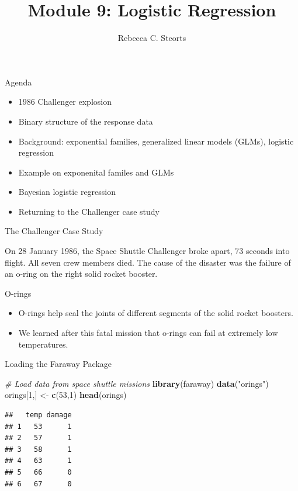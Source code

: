 \documentclass[
  ignorenonframetext,
]{beamer}
\title{Module 9: Logistic Regression}
\author{Rebecca C. Steorts}
\date{}
\newenvironment{Shaded}{\begin{snugshade}}{\end{snugshade}}
\newcommand{\CommentTok}[1]{\textcolor[rgb]{0.56,0.35,0.01}{\textit{#1}}}
\newcommand{\DecValTok}[1]{\textcolor[rgb]{0.00,0.00,0.81}{#1}}
\newcommand{\KeywordTok}[1]{\textcolor[rgb]{0.13,0.29,0.53}{\textbf{#1}}}
\newcommand{\NormalTok}[1]{#1}
\newcommand{\StringTok}[1]{\textcolor[rgb]{0.31,0.60,0.02}{#1}}
\providecommand{\tightlist}{%
  \setlength{\itemsep}{0pt}\setlength{\parskip}{0pt}}
\begin{document}
\frame{\titlepage}

\begin{frame}{Agenda}
\protect\hypertarget{agenda}{}

\begin{itemize}
\tightlist
\item
  1986 Challenger explosion
\item
  Binary structure of the response data
\item
  Background: exponential families, generalized linear models (GLMs),
  logistic regression
\item
  Example on exponenital familes and GLMs
\item
  Bayesian logistic regression
\item
  Returning to the Challenger case study
\end{itemize}

\end{frame}

\begin{frame}{The Challenger Case Study}
\protect\hypertarget{the-challenger-case-study}{}

On 28 January 1986, the Space Shuttle Challenger broke apart, 73 seconds
into flight. All seven crew members died. The cause of the disaster was
the failure of an o-ring on the right solid rocket booster.

\end{frame}

\begin{frame}{O-rings}
\protect\hypertarget{o-rings}{}

\begin{itemize}
\item
  O-rings help seal the joints of different segments of the solid rocket
  boosters.
\item
  We learned after this fatal mission that o-rings can fail at extremely
  low temperatures.
\end{itemize}

\end{frame}

\begin{frame}[fragile]{Loading the Faraway Package}
\protect\hypertarget{loading-the-faraway-package}{}

\begin{Shaded}
\begin{Highlighting}[]
\CommentTok{# Load data from space shuttle missions}
\KeywordTok{library}\NormalTok{(faraway)}
\KeywordTok{data}\NormalTok{(}\StringTok{"orings"}\NormalTok{)}
\NormalTok{orings[}\DecValTok{1}\NormalTok{,] <-}\StringTok{ }\KeywordTok{c}\NormalTok{(}\DecValTok{53}\NormalTok{,}\DecValTok{1}\NormalTok{)}
\KeywordTok{head}\NormalTok{(orings)}
\end{Highlighting}
\end{Shaded}

\begin{verbatim}
##   temp damage
## 1   53      1
## 2   57      1
## 3   58      1
## 4   63      1
## 5   66      0
## 6   67      0
\end{verbatim}

\end{frame}
\end{document}
